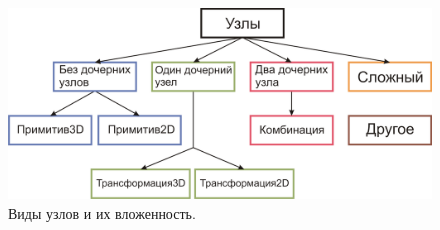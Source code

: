 \documentclass[a4paper,hidelinks,12pt]{article}
\begin{document}
\begin{figure}[H]
\begin{center}
	\includegraphics[width=15 cm]{Graphic_nodes_rus.png}
	\caption{Виды узлов и их вложенность.}
 	\label{fig_nodes}
\end{center}
\end{figure}
\end{document}
